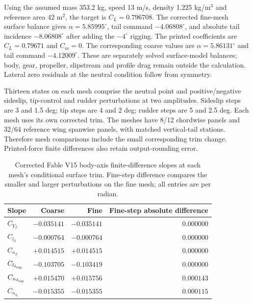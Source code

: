 \documentclass[10pt,letterpaper]{article}
\begin{document}
Using the assumed mass 353.2 kg, speed 13 m/s, density 1.225 kg/m$^3$ and
reference area 42 m$^2$, the target is $C_L=0.796708$.
The corrected fine-mesh surface balance gives $\alpha=5.85995^\circ$, tail command $-4.06808^\circ$, and absolute tail incidence $-8.06808^\circ$ after adding the $-4^\circ$ rigging. The printed coefficients are $C_L=0.79671$ and $C_m=0$. The corresponding coarse values are $\alpha=5.86131^\circ$ and tail command $-4.12009^\circ$. These are separately solved surface-model balances; body, gear, propeller, slipstream and profile drag remain outside the calculation. Lateral zero residuals at the neutral condition follow from symmetry.

Thirteen states on each mesh comprise the neutral point and positive/negative
sideslip, tip-control and rudder perturbations at two amplitudes. Sideslip
steps are 3 and 1.5 deg; tip steps are 4 and 2 deg; rudder steps are 5 and
2.5 deg. Each mesh uses its own corrected trim. The meshes have 8/12 chordwise
panels and 32/64 reference wing spanwise panels, with matched vertical-tail
stations. Therefore mesh comparisons include the small corresponding trim
change. Printed-force finite differences also retain output-rounding error.

\begin{table}[p]\centering\small
\caption{Corrected Fable V15 body-axis finite-difference slopes at each mesh's conditional surface trim. Fine-step difference compares the smaller and larger perturbations on the fine mesh; all entries are per radian.}
\label{tab:v15-fable-lateral}
\begin{tabular}{lrrr}\toprule
Slope & Coarse & Fine & Fine-step absolute difference\\\midrule
$C_{Y_\beta}$ & $-0.035141$ & $-0.035141$ & $0.000000$\\
$C_{l_\beta}$ & $-0.000764$ & $-0.000764$ & $0.000000$\\
$C_{n_\beta}$ & $+0.014515$ & $+0.014515$ & $0.000000$\\
$C_{l_{\delta_{\rm tip}}}$ & $-0.103705$ & $-0.103419$ & $0.000000$\\
$C_{n_{\delta_{\rm tip}}}$ & $+0.015470$ & $+0.015756$ & $0.000143$\\
$C_{n_{\delta_r}}$ & $-0.015355$ & $-0.015355$ & $0.000115$\\
\bottomrule\end{tabular}\end{table}
\end{document}
